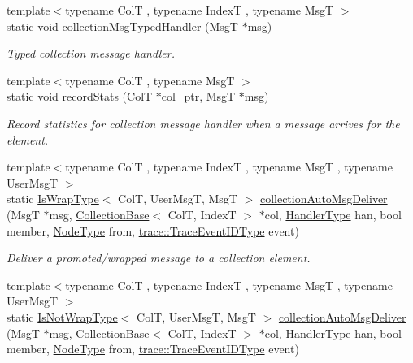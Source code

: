 \begin{DoxyCompactItemize}
{\footnotesize template$<$typename ColT , typename IndexT , typename MsgT $>$ }\\static void \hyperlink{structvt_1_1vrt_1_1collection_1_1_collection_manager_a7bb443544c8c4b94a7a10a0ec8126018}{collection\+Msg\+Typed\+Handler} (MsgT $\ast$msg)
\begin{DoxyCompactList}\small\item\em Typed collection message handler. \end{DoxyCompactList}\item 
{\footnotesize template$<$typename ColT , typename MsgT $>$ }\\static void \hyperlink{structvt_1_1vrt_1_1collection_1_1_collection_manager_a3d49cc2ae24c50443e890e9447d408a9}{record\+Stats} (ColT $\ast$col\+\_\+ptr, MsgT $\ast$msg)
\begin{DoxyCompactList}\small\item\em Record statistics for collection message handler when a message arrives for the element. \end{DoxyCompactList}\item 
{\footnotesize template$<$typename ColT , typename IndexT , typename MsgT , typename User\+MsgT $>$ }\\static \hyperlink{structvt_1_1vrt_1_1collection_1_1_collection_manager_a1f91c97ed52237c3a3576dfbbe87c8f8}{Is\+Wrap\+Type}$<$ ColT, User\+MsgT, MsgT $>$ \hyperlink{structvt_1_1vrt_1_1collection_1_1_collection_manager_a4816815fd287f57cab4db958985c193c}{collection\+Auto\+Msg\+Deliver} (MsgT $\ast$msg, \hyperlink{structvt_1_1vrt_1_1collection_1_1_collection_base}{Collection\+Base}$<$ ColT, IndexT $>$ $\ast$col, \hyperlink{namespacevt_af64846b57dfcaf104da3ef6967917573}{Handler\+Type} han, bool member, \hyperlink{namespacevt_a866da9d0efc19c0a1ce79e9e492f47e2}{Node\+Type} from, \hyperlink{namespacevt_1_1trace_a64a7185f3e102df8d8258f263ccd1582}{trace\+::\+Trace\+Event\+I\+D\+Type} event)
\begin{DoxyCompactList}\small\item\em Deliver a promoted/wrapped message to a collection element. \end{DoxyCompactList}\item 
{\footnotesize template$<$typename ColT , typename IndexT , typename MsgT , typename User\+MsgT $>$ }\\static \hyperlink{structvt_1_1vrt_1_1collection_1_1_collection_manager_a18e3a17d9eb086c6c2f499242b7faa1e}{Is\+Not\+Wrap\+Type}$<$ ColT, User\+MsgT, MsgT $>$ \hyperlink{structvt_1_1vrt_1_1collection_1_1_collection_manager_a14b3a40fcde230a6113d032b8175d15d}{collection\+Auto\+Msg\+Deliver} (MsgT $\ast$msg, \hyperlink{structvt_1_1vrt_1_1collection_1_1_collection_base}{Collection\+Base}$<$ ColT, IndexT $>$ $\ast$col, \hyperlink{namespacevt_af64846b57dfcaf104da3ef6967917573}{Handler\+Type} han, bool member, \hyperlink{namespacevt_a866da9d0efc19c0a1ce79e9e492f47e2}{Node\+Type} from, \hyperlink{namespacevt_1_1trace_a64a7185f3e102df8d8258f263ccd1582}{trace\+::\+Trace\+Event\+I\+D\+Type} event)

\end{DoxyCompactItemize}
